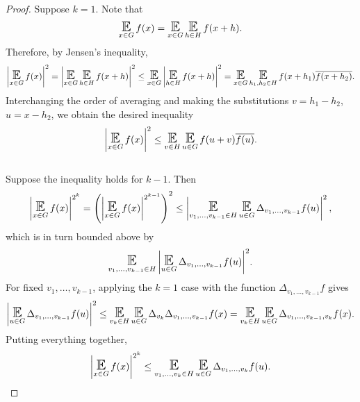 \documentclass{amsart}
\theoremstyle{definition}
\numberwithin{equation}{section}
\DeclareMathOperator*{\E}{\text{\Large $\mathbb{E}$}}
\begin{document}
\begin{proof}
	Suppose $k =1$.
	Note that
	\begin{equation*}
		\E_{x \in G}{f(x)} = \E_{x \in G}{\E_{h \in H}{f(x+h)}}.
	\end{equation*}
	Therefore, by Jensen's inequality,
	\begin{equation*}
		\left| \E_{x \in G}{f(x)} \right|^2
		 = \left| \E_{x \in G}{\E_{h \in H}{f(x+h)}} \right|^2
		 \le \E_{x \in G}{\left| \E_{h \in H}{f(x+h)} \right|^2}
		 = \E_{x \in G}{\E_{h_1, h_2 \in H}{f(x+h_1) \overline{f(x+h_2)}}}.
	\end{equation*}
	Interchanging the order of averaging and making the substitutions $v = h_1 - h_2$, $u = x - h_2$,
	we obtain the desired inequality
	\begin{equation*}
		\left| \E_{x \in G}{f(x)} \right|^2 \le \E_{v \in H}{\E_{u \in G}{f(u+v) \overline{f(u)}}}.
	\end{equation*} \\
	
	Suppose the inequality holds for $k - 1$.
	Then
	\begin{equation*}
		\left| \E_{x \in G}{f(x)} \right|^{2^k}
		 = \left( \left| \E_{x \in G}{f(x)} \right|^{2^{k-1}} \right)^2
		 \le \left| \E_{v_1, \dots, v_{k-1} \in H}{\E_{u \in G}{\Delta_{v_1, \dots, v_{k-1}}f(u)}} \right|^2,
	\end{equation*}
	which is in turn bounded above by
	\begin{equation*}
		\E_{v_1, \dots, v_{k-1} \in H}{\left| \E_{u \in G}{\Delta_{v_1, \dots, v_{k-1}}f(u)} \right|^2}.
	\end{equation*}
	For fixed $v_1, \dots, v_{k-1}$, applying the $k=1$ case with the function $\Delta_{v_1, \dots, v_{k-1}}f$ gives
	\begin{equation*}
		\left| \E_{u \in G}{\Delta_{v_1, \dots, v_{k-1}}f(u)} \right|^2
		 \le \E_{v_k \in H}{\E_{u \in G}{\Delta_{v_k}\Delta_{v_1, \dots, v_{k-1}}f(x)}}
		 = \E_{v_k \in H}{\E_{u \in G}{\Delta_{v_1, \dots, v_{k-1}, v_k}f(x)}}.
	\end{equation*}
	Putting everything together,
	\begin{equation*}
		\left| \E_{x \in G}{f(x)} \right|^{2^k} \le \E_{v_1, \dots, v_k \in H}{\E_{u \in G}{\Delta_{v_1, \dots, v_k}f(u)}}.
	\end{equation*}
\end{proof}
\end{document}
